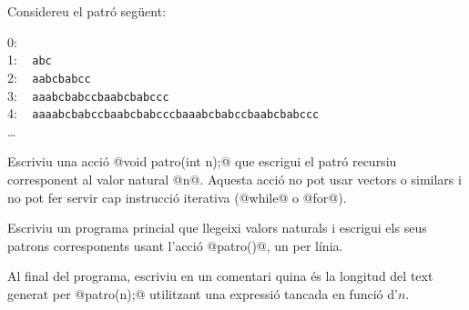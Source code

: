 

\Statement

Considereu el patró següent:

\bigskip

\hspace*{2cm}0: ~ \\
\hspace*{2cm}1: ~ \texttt{abc}\\
\hspace*{2cm}2: ~ \texttt{aabcbabcc}\\
\hspace*{2cm}3: ~ \texttt{aaabcbabccbaabcbabccc}\\
\hspace*{2cm}4: ~ \texttt{aaaabcbabccbaabcbabcccbaaabcbabccbaabcbabccc}\\
\hspace*{2cm}\dots

\bigskip

Escriviu una acció @void patro(int n);@ que  escrigui el patró  recursiu
corresponent al valor natural @n@. Aquesta acció no pot usar vectors o
similars i no pot fer servir cap instrucció iterativa (@while@ o @for@).

\bigskip

Escriviu un programa princial que llegeixi valors naturals i escrigui els seus patrons
corresponents usant l'acció @patro()@, un per línia.

\bigskip

Al final del programa, escriviu en un comentari quina és la longitud del
text generat per @patro(n);@ utilitzant una expressió tancada en funció d'$n$.

\SampleOneCol

